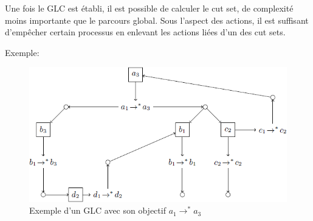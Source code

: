 \documentclass[11pt]{report}
\theoremstyle{definition}
\begin{document}
Une fois le GLC est \'etabli, il est possible de calculer le cut set, de complexit\'e moins importante que le parcours global. Sous l'aspect des actions, il est suffisant d'emp\^echer certain processus en enlevant les actions li\'ees d'un des cut sets.

Exemple:

\begin{figure}[ht]
\centering
\includegraphics[scale=0.6]{cutset.png}
\caption{Exemple d'un GLC avec son objectif $a_1\to^*a_3$}
\end{figure}\label{figcut}
\end{document}
